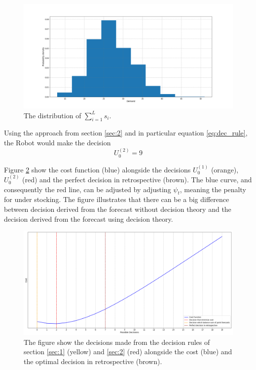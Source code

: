 \begin{example}
	\begin{figure}[H]
		\centering
		\includegraphics[width = 1\textwidth]{figures/demand_density.png}
		\caption{The distribution of $\sum_{i=1}^{L}s_i$.}
		\label{fig:demand_density}
	\end{figure}
	
	Using the approach from section \ref{sec:2} and in particular equation \eqref{eq:dec_rule}, the Robot would make the decision
	\begin{equation}
		U_0^{(2)}=9
	\end{equation}
	
	Figure \ref{fig:cost_function} show the cost function (blue) alongside the decisions $U_0^{(1)}$ (orange), $U_0^{(2)}$ (red) and the perfect decision in retrospective (brown). The blue curve, and consequently the red line, can be adjusted by adjusting $\psi_t$, meaning the penalty for under stocking. The figure illustrates that there can be a big difference between decision derived from the forecast without decision theory and the decision derived from the forecast using decision theory. 
	
	\begin{figure}[H]
		\centering
		\includegraphics[width = 1\textwidth]{figures/cost_function.png}
		\caption{The figure show the decisions made from the decision rules of section \ref{sec:1} (yellow) and \ref{sec:2} (red) alongside the cost (blue) and the optimal decision in retrospective (brown).}
		\label{fig:cost_function}
	\end{figure} 
\end{example}

